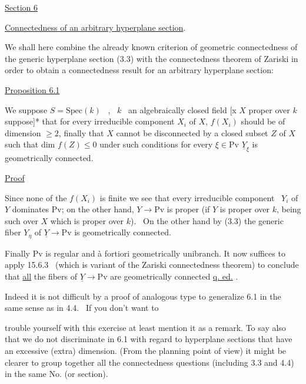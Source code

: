 \documentclass[11pt]{article}
\newcommand{\scanpage}[1]{\par\bigskip\noindent{\small\sffamily[scan #1]}\par}
\newcommand{\mspage}[1]{{\small\sffamily[p.\,#1]}}
\newcommand{\uline}[1]{\underline{#1}}
\begin{document}
\uline{Section 6}

\uline{Connectedness of an arbitrary hyperplane section}.

We shall here combine the already known criterion of
geometric connectedness of the generic hyperplane section (3.3)
with the connectedness theorem of Zariski in order to obtain a
connectedness result for an arbitrary hyperplane section:

\uline{Proposition 6.1}

We suppose $S = \mathrm{Spec}(k)$ \ , \ $k$ \ an algebraically closed
field [x $X$ proper over $k$ suppose]* that for every irreducible
component $X_i$ of $X$, $f(X_i)$ should be of dimension $\geq 2$, finally that $X$
cannot be disconnected by a closed subset $Z$ of $X$ such that dim
$f(Z) \leq 0$ under such conditions for every $\xi \in \mathrm{Pv}$ \quad $\underline{Y}_{\xi}$ is
geometrically connected.

\uline{Proof}

Since none of the $f(X_i)$ is finite we see that every
irreducible component \ $Y_i$ of $Y$ dominates Pv; on the other hand,
$Y \longrightarrow \mathrm{Pv}$ is proper (if $Y$ is proper over $k$, being such over $X$ which
is proper over $k$). \ On the other hand by (3.3) the generic fiber $Y_{\eta}$
of $\underline{Y} \longrightarrow \mathrm{Pv}$ is geometrically connected.

Finally Pv is regular and à fortiori geometrically unibranch.
It now suffices to apply 15.6.3 \ (which is variant of the Zariski
connectedness theorem) to conclude that \uline{all} the fibers of $\underline{Y} \longrightarrow \mathrm{Pv}$
are geometrically connected \uline{q. ed.} .

Indeed it is not difficult by a proof of analogous type to
generalize 6.1 in the same sense as in 4.4. \ If you don't want to

\clearpage
\scanpage{24/31}
\mspage{31}

trouble yourself with this exercise at least mention it as a
remark.  To say also that we do not discriminate in 6.1 with
regard to hyperplane sections that have an excessive (extra)
dimension.
(From the planning point of view) it might be clearer to group
together all the connectedness questions (including 3.3 and 4.4)
in the same No. (or section).
\end{document}
